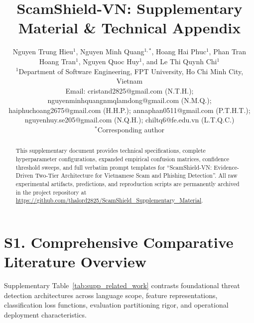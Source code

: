 \documentclass[journal]{IEEEtran}
\begin{document}
\title{ScamShield-VN: Supplementary Material \& Technical Appendix}

\author{
    Nguyen Trung Hieu$^{1}$,
    Nguyen Minh Quang$^{1,*}$,
    Hoang Hai Phuc$^{1}$,
    Phan Tran Hoang Tran$^{1}$,
    Nguyen Quoc Huy$^{1}$, and
    Le Thi Quynh Chi$^{1}$\\[0.4em]
    $^{1}$Department of Software Engineering, FPT University, Ho Chi Minh City, Vietnam\\[0.2em]
    Email: cristand2825@gmail.com (N.T.H.); nguyenminhquangnmqlamdong@gmail.com (N.M.Q.);\\
    haiphuchoang2675@gmail.com (H.H.P.); annaphan0511@gmail.com (P.T.H.T.);\\
    nguyenhuy.se205@gmail.com (N.Q.H.); chiltq6@fe.edu.vn (L.T.Q.C.)\\[0.2em]
    $^*$Corresponding author
}

\maketitle

\begin{abstract}
This supplementary document provides technical specifications, complete hyperparameter configurations, expanded empirical confusion matrices, confidence threshold sweeps, and full verbatim prompt templates for ``ScamShield-VN: Evidence-Driven Two-Tier Architecture for Vietnamese Scam and Phishing Detection''. All raw experimental artifacts, predictions, and reproduction scripts are permanently archived in the project repository at \url{https://github.com/thalord2825/ScamShield_Supplementary_Material}.
\end{abstract}

\section{S1. Comprehensive Comparative Literature Overview}
\label{sec:supp_lit}

Supplementary Table~\ref{tab:supp_related_work} contrasts foundational threat detection architectures across language scope, feature representations, classification loss functions, evaluation partitioning rigor, and operational deployment characteristics.
\end{document}
